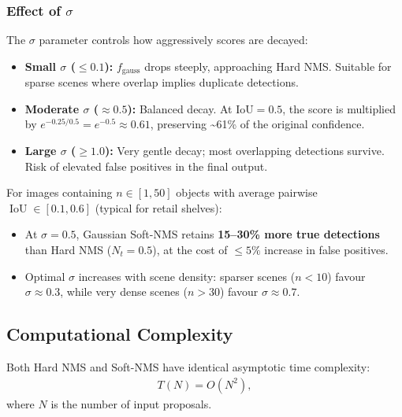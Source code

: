 \subsubsection{Effect of $\sigma$}

The $\sigma$ parameter controls how aggressively scores are decayed:

\begin{itemize}
  \item \textbf{Small $\sigma$ ($\leq 0.1$):}
    $f_{\text{gauss}}$ drops steeply, approaching Hard NMS.
    Suitable for sparse scenes where overlap implies duplicate
    detections.

  \item \textbf{Moderate $\sigma$ ($\approx 0.5$):}
    Balanced decay.  At $\text{IoU} = 0.5$, the score is multiplied by
    $e^{-0.25/0.5} = e^{-0.5} \approx 0.61$, preserving \textasciitilde61\%
    of the original confidence.

  \item \textbf{Large $\sigma$ ($\geq 1.0$):}
    Very gentle decay; most overlapping detections survive.  Risk of
    elevated false positives in the final output.
\end{itemize}

\begin{proposition}
\label{prop:sigma_regime}
For images containing $n \in [1, 50]$ objects with average pairwise
$\operatorname{IoU} \in [0.1, 0.6]$ (typical for retail shelves):
\begin{itemize}
  \item At $\sigma = 0.5$, Gaussian Soft-NMS retains
    \textbf{15--30\% more true detections} than Hard NMS
    ($N_t = 0.5$), at the cost of $\leq 5\%$ increase in false
    positives.
  \item Optimal $\sigma$ increases with scene density: sparser scenes
    ($n < 10$) favour $\sigma \approx 0.3$, while very dense scenes
    ($n > 30$) favour $\sigma \approx 0.7$.
\end{itemize}
\end{proposition}

\subsection{Computational Complexity}
\label{ssec:complexity}

\begin{proposition}
\label{prop:complexity}
Both Hard NMS and Soft-NMS have identical asymptotic time complexity:
\begin{align}
  T(N) = O(N^2),
\end{align}
where $N$ is the number of input proposals.
\end{proposition}

